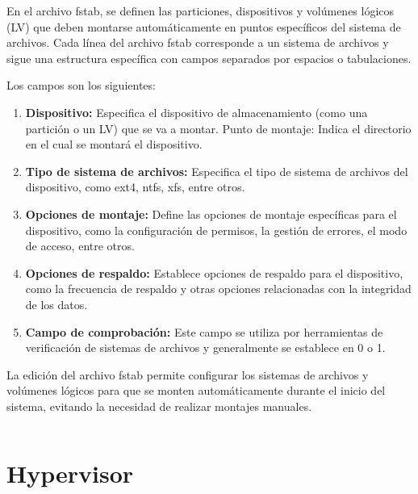 			En el archivo fstab, se definen las particiones, dispositivos y volúmenes lógicos (LV) que deben montarse automáticamente en puntos específicos del sistema de archivos. Cada línea del archivo fstab corresponde a un sistema de archivos y sigue una estructura específica con campos separados por espacios o tabulaciones.\par
			
			Los campos son los siguientes:
			
			\begin{enumerate}
				
				\item \textbf{Dispositivo:} Especifica el dispositivo de almacenamiento (como una partición o un LV) que se va a montar.
				Punto de montaje: Indica el directorio en el cual se montará el dispositivo.
			
				\item \textbf{Tipo de sistema de archivos:} Especifica el tipo de sistema de archivos del dispositivo, como ext4, ntfs, xfs, entre otros.
			
				\item \textbf{Opciones de montaje:} Define las opciones de montaje específicas para el dispositivo, como la configuración de permisos, la gestión de errores, el modo de acceso, entre otros.
			
				\item \textbf{Opciones de respaldo:} Establece opciones de respaldo para el dispositivo, como la frecuencia de respaldo y otras opciones relacionadas con la integridad de los datos.
			
				\item \textbf{Campo de comprobación:} Este campo se utiliza por herramientas de verificación de sistemas de archivos y generalmente se establece en 0 o 1.
			
			\end{enumerate}
		
			La edición del archivo fstab permite configurar los sistemas de archivos y volúmenes lógicos para que se monten automáticamente durante el inicio del sistema, evitando la necesidad de realizar montajes manuales.

				\vspace{0.3cm}
									
				\inputminted{bash}{documentos/fstab/fstab}
				
			
			\section{Hypervisor}
			
